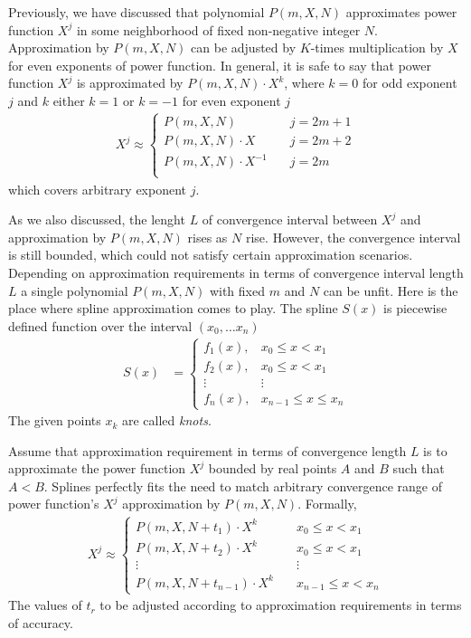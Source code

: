 ﻿Previously, we have discussed that polynomial $P(m,X,N)$ approximates power function $X^j$
in some neighborhood of fixed non-negative integer $N$.
Approximation by $P(m,X,N)$ can be adjusted by $K$-times multiplication by $X$ for even exponents of power function.
In general, it is safe to say that power function $X^j$ is approximated by $P(m,X,N) \cdot X^k$,
where $k=0$ for odd exponent $j$ and $k$ either $k=1$ or $k=-1$ for even exponent $j$
\begin{align*}
    X^j \approx
    \begin{cases}
        P(m,X,N) \quad         & j=2m+1 \\
        P(m,X,N) \cdot X \quad & j=2m+2 \\
        P(m,X,N) \cdot X^{-1} \quad & j=2m \\
    \end{cases}
\end{align*}
which covers arbitrary exponent $j$.

As we also discussed, the lenght $L$ of convergence interval between $X^j$ and approximation by $P(m,X,N)$
rises as $N$ rise.
However, the convergence interval is still bounded, which could not satisfy certain approximation scenarios.
Depending on approximation requirements in terms of convergence interval length $L$ a single polynomial $P(m,X,N)$
with fixed $m$ and $N$ can be unfit.
Here is the place where spline approximation comes to play.
The spline $S(x)$ is piecewise defined function over the interval $(x_0, \ldots x_n)$
\begin{align*}
    S(x) &=
    \begin{cases}
        f_1(x), & x_0 \leq x < x_1 \\
        f_2(x), & x_0 \leq x < x_1\\
        \vdots & \vdots \\
        f_n(x), & x_{n-1} \leq x \leq x_n
    \end{cases}
\end{align*}
The given points $x_k$ are called \textit{knots}.

Assume that approximation requirement in terms of convergence length $L$ is to approximate the power function $X^j$
bounded by real points $A$ and $B$ such that $A < B$.
Splines perfectly fits the need to match arbitrary convergence range of power function's $X^j$
approximation by $P(m,X,N)$.
Formally,
\begin{align*}
    X^j \approx
    \begin{cases}
        P(m,X,N+t_1) \cdot X^{k} \quad & x_0 \leq x < x_1 \\
        P(m,X,N+t_2) \cdot X^{k} \quad & x_0 \leq x < x_1 \\
        \vdots & \vdots \\
        P(m,X,N+t_{n-1}) \cdot X^{k} \quad & x_{n-1} \leq x < x_n
    \end{cases}
\end{align*}
The values of $t_r$ to be adjusted according to approximation requirements in terms of accuracy.
